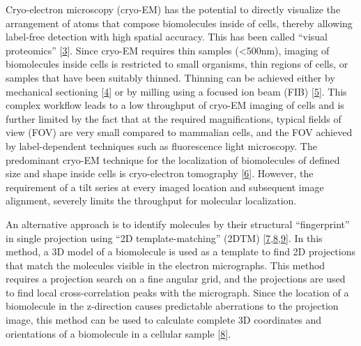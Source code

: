 \documentclass[
]{article}
\begin{document}
Cryo-electron microscopy (cryo-EM) has the potential to directly
visualize the arrangement of atoms that compose biomolecules inside of
cells, thereby allowing label-free detection with high spatial accuracy.
This has been called ``visual proteomics'' {[}\protect\hyperlink{ref-tGQ6TSUo}{3}{]}. Since
cryo-EM requires thin samples (\textless500nm), imaging of biomolecules inside
cells is restricted to small organisms, thin regions of cells, or
samples that have been suitably thinned. Thinning can be achieved either
by mechanical sectioning {[}\protect\hyperlink{ref-g8QavfwP}{4}{]} or by
milling using a focused ion beam (FIB) {[}\protect\hyperlink{ref-16IhS1Nc4}{5}{]}.
This complex workflow leads to a low throughput of cryo-EM imaging of
cells and is further limited by the fact that at the required
magnifications, typical fields of view (FOV) are very small compared to
mammalian cells, and the FOV achieved by label-dependent techniques such
as fluorescence light microscopy. The predominant cryo-EM technique for
the localization of biomolecules of defined size and shape inside cells
is cryo-electron tomography {[}\protect\hyperlink{ref-Rksh2dxu}{6}{]}. However,
the requirement of a tilt series at every imaged location and subsequent
image alignment, severely limits the throughput for molecular
localization.

An alternative approach is to identify molecules by their structural
``fingerprint'' in single projection using ``2D template-matching'' (2DTM)
{[}\protect\hyperlink{ref-Ynb3IP6I}{7},\protect\hyperlink{ref-18KGpXYPE}{8},\protect\hyperlink{ref-10bXZuF3G}{9}{]}.
In this method, a 3D model of a biomolecule is used as a template to
find 2D projections that match the molecules visible in the electron
micrographs. This method requires a projection search on a fine angular
grid, and the projections are used to find local cross-correlation peaks
with the micrograph. Since the location of a biomolecule in the
z-direction causes predictable aberrations to the projection image, this
method can be used to calculate complete 3D coordinates and orientations
of a biomolecule in a cellular sample {[}\protect\hyperlink{ref-18KGpXYPE}{8}{]}.
\end{document}
